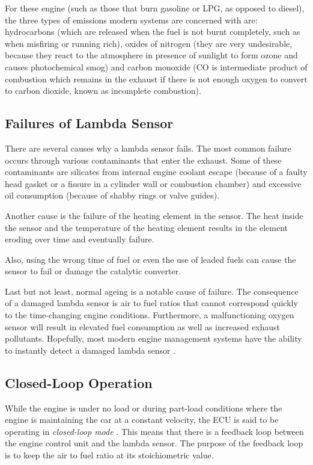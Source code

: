 For these engine (such as those that burn gasoline or LPG, as opposed to diesel), the three types of emissions modern systems are concerned with are: hydrocarbons (which are released when the fuel is not burnt completely, such as when misfiring or running rich), oxides of nitrogen (they are very undesirable, because they react to the atmosphere in presence of sunlight to form ozone and causes photochemical smog) and carbon monoxide (CO is intermediate product of combustion which remains in the exhaust if there is not enough oxygen to convert to carbon dioxide, known as incomplete combustion)\cite{sher1998handbook}.

\subsection{Failures of Lambda Sensor}
There are several causes why a lambda sensor fails. The most common failure occurs through various contaminants that enter the exhaust. Some of these contaminants are silicates from internal engine coolant escape (because of a faulty head gasket or a fissure in a cylinder wall or combustion chamber) and excessive oil consumption (because of shabby rings or valve guides). 

Another cause is the failure of the heating element in the sensor. The heat inside the sensor and the temperature of the heating element results in the element eroding over time and eventually failure.

Also, using the wrong time of fuel or even the use of leaded fuels can cause the sensor to fail or damage the catalytic converter. 
 
Last but not least, normal ageing is a notable cause of failure.
The consequence of a damaged lambda sensor is air to fuel ratios
that cannot correspond quickly to the time-changing engine conditions. Furthermore, a malfunctioning oxygen sensor will result in elevated fuel consumption as well as increased exhaust pollutants. 
Hopefully, most modern engine management systems have the ability to instantly detect a damaged lambda sensor \cite{baltusis2004board}.


\subsection{Closed-Loop Operation}
While the engine is under no load or during part-load conditions where the engine is maintaining the car at a constant velocity, the ECU is said to be operating in \textit{closed-loop mode} \cite{richter2006understanding}. This means that there is a feedback loop between the engine control unit and the lambda sensor. The purpose of the feedback loop is to keep the air to fuel ratio at its stoichiometric value.


